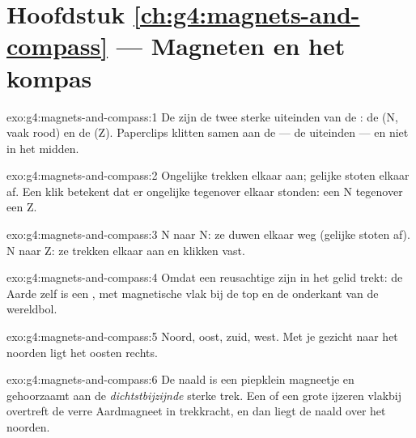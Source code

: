 \section*{Hoofdstuk \ref{ch:g4:magnets-and-compass} --- Magneten en het kompas}

\begin{solution}{exo:g4:magnets-and-compass:1}
De  zijn de twee sterke uiteinden van de : de
 (N, vaak rood) en de  (Z). Paperclips klitten
samen aan de  --- de uiteinden --- en niet in het midden.
\end{solution}

\begin{solution}{exo:g4:magnets-and-compass:2}
Ongelijke  trekken elkaar aan; gelijke  stoten elkaar
af. Een klik betekent dat er ongelijke  tegenover elkaar stonden:
een N tegenover een Z.
\end{solution}

\begin{solution}{exo:g4:magnets-and-compass:3}
N naar N: ze duwen elkaar weg (gelijke  stoten af). N naar Z: ze
trekken elkaar aan en klikken vast.
\end{solution}

\begin{solution}{exo:g4:magnets-and-compass:4}
Omdat een reusachtige  zijn  in het gelid trekt: de Aarde
zelf is een , met magnetische  vlak bij de top en de
onderkant van de wereldbol.
\end{solution}

\begin{solution}{exo:g4:magnets-and-compass:5}
Noord, oost, zuid, west. Met je gezicht naar het noorden ligt het
oosten rechts.
\end{solution}

\begin{solution}{exo:g4:magnets-and-compass:6}
De naald is een piepklein magneetje en gehoorzaamt aan de
\emph{dichtstbijzijnde} sterke trek. Een  of een grote ijzeren
 vlakbij overtreft de verre Aardmagneet in trekkracht, en dan
liegt de naald over het noorden.
\end{solution}

